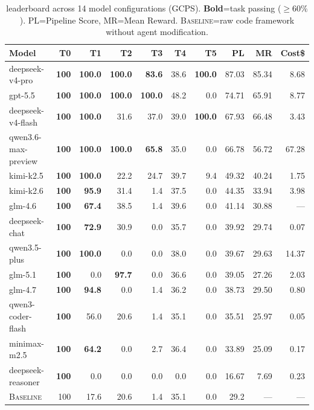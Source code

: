 \begin{table}[!t]
\centering
\caption{\eva{} \Progressive{} leaderboard across 14 model configurations (GCPS). \textbf{Bold}=task passing ($\geq 60\%$). PL=Pipeline Score, MR=Mean Reward. \textsc{Baseline}=raw code framework without agent modification.}
\small
\begin{tabular}{lrrrrrrrrr}
\toprule
\textbf{Model} & \textbf{T0} & \textbf{T1} & \textbf{T2} & \textbf{T3} & \textbf{T4} & \textbf{T5} & \textbf{PL} & \textbf{MR} & \textbf{Cost\$} \\
\midrule
deepseek-v4-pro & \textbf{100} & \textbf{100.0} & \textbf{100.0} & \textbf{83.6} & 38.6 & \textbf{100.0} & 87.03 & 85.34 & 8.68 \\
gpt-5.5 & \textbf{100} & \textbf{100.0} & \textbf{100.0} & \textbf{100.0} & 48.2 & 0.0 & 74.71 & 65.91 & 8.77 \\
deepseek-v4-flash & \textbf{100} & \textbf{100.0} & 31.6 & 37.0 & 39.0 & \textbf{100.0} & 67.93 & 66.48 & 3.43 \\
qwen3.6-max-preview & \textbf{100} & \textbf{100.0} & \textbf{100.0} & \textbf{65.8} & 35.0 & 0.0 & 66.78 & 56.72 & 67.28 \\
kimi-k2.5 & \textbf{100} & \textbf{100.0} & 22.2 & 24.7 & 39.7 & 9.4 & 49.32 & 40.24 & 1.75 \\
kimi-k2.6 & \textbf{100} & \textbf{95.9} & 31.4 & 1.4 & 37.5 & 0.0 & 44.35 & 33.94 & 3.98 \\
glm-4.6 & \textbf{100} & \textbf{67.4} & 38.5 & 1.4 & 39.6 & 0.0 & 41.14 & 30.88 & --- \\
deepseek-chat & \textbf{100} & \textbf{72.9} & 30.9 & 0.0 & 35.7 & 0.0 & 39.92 & 29.74 & 0.07 \\
qwen3.5-plus & \textbf{100} & \textbf{100.0} & 0.0 & 0.0 & 38.0 & 0.0 & 39.67 & 29.63 & 14.37 \\
glm-5.1 & \textbf{100} & 0.0 & \textbf{97.7} & 0.0 & 36.6 & 0.0 & 39.05 & 27.26 & 2.03 \\
glm-4.7 & \textbf{100} & \textbf{94.8} & 0.0 & 1.4 & 36.2 & 0.0 & 38.73 & 29.50 & 0.80 \\
qwen3-coder-flash & \textbf{100} & 56.0 & 20.6 & 1.4 & 35.1 & 0.0 & 35.51 & 25.97 & 0.05 \\
minimax-m2.5 & \textbf{100} & \textbf{64.2} & 0.0 & 2.7 & 36.4 & 0.0 & 33.89 & 25.09 & 0.17 \\
deepseek-reasoner & \textbf{100} & 0.0 & 0.0 & 0.0 & 0.0 & 0.0 & 16.67 & 7.69 & 0.23 \\
\midrule
\textsc{Baseline} & 100 & 17.6 & 20.6 & 1.4 & 35.1 & 0.0 & 29.2 & --- & --- \\
\bottomrule
\end{tabular}
\label{tab:main}
\end{table}
